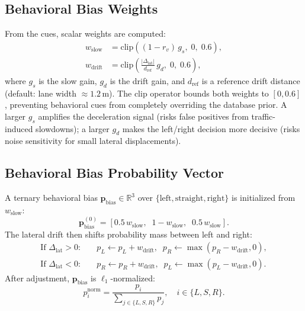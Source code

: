\documentclass[conference]{IEEEtran}
\begin{document}
\subsection{Behavioral Bias Weights}
From the cues, scalar weights are computed:
\begin{align}
  w_{\mathrm{slow}}  &= \mathrm{clip}\!\left((1 - r_v)\,g_s,\; 0,\; 0.6\right), \\
  w_{\mathrm{drift}} &= \mathrm{clip}\!\left(\frac{|\Delta_{\mathrm{lat}}|}{d_{\mathrm{ref}}}\,g_d,\; 0,\; 0.6\right),
\end{align}
where $g_s$ is the slow gain, $g_d$ is the drift gain, and $d_{\mathrm{ref}}$ is a reference drift distance (default: lane width $\approx 1.2$\,m).
The clip operator bounds both weights to $[0, 0.6]$, preventing behavioral cues from completely overriding the database prior.
A larger $g_s$ amplifies the deceleration signal (risks false positives from traffic-induced slowdowns); a larger $g_d$ makes the left/right decision more decisive (risks noise sensitivity for small lateral displacements).

\subsection{Behavioral Bias Probability Vector}
A ternary behavioral bias $\mathbf{p}_{\mathrm{bias}} \in \mathbb{R}^3$ over $\{\mathrm{left}, \mathrm{straight}, \mathrm{right}\}$ is initialized from $w_{\mathrm{slow}}$:
\begin{equation}
  \mathbf{p}_{\mathrm{bias}}^{(0)} = \left[0.5\, w_{\mathrm{slow}},\;\; 1 - w_{\mathrm{slow}},\;\; 0.5\, w_{\mathrm{slow}}\right].
\end{equation}
The lateral drift then shifts probability mass between left and right:
\begin{align}
  \text{If } \Delta_{\mathrm{lat}} > 0:&\quad p_L \leftarrow p_L + w_{\mathrm{drift}},\;\; p_R \leftarrow \max(p_R - w_{\mathrm{drift}}, 0), \label{eq:drift_left}\\
  \text{If } \Delta_{\mathrm{lat}} < 0:&\quad p_R \leftarrow p_R + w_{\mathrm{drift}},\;\; p_L \leftarrow \max(p_L - w_{\mathrm{drift}}, 0). \label{eq:drift_right}
\end{align}
After adjustment, $\mathbf{p}_{\mathrm{bias}}$ is $\ell_1$-normalized:
\begin{equation}
  p_i^{\mathrm{norm}} = \frac{p_i}{\sum_{j \in \{L,S,R\}} p_j}, \quad i \in \{L, S, R\}.
\end{equation}
\end{document}
